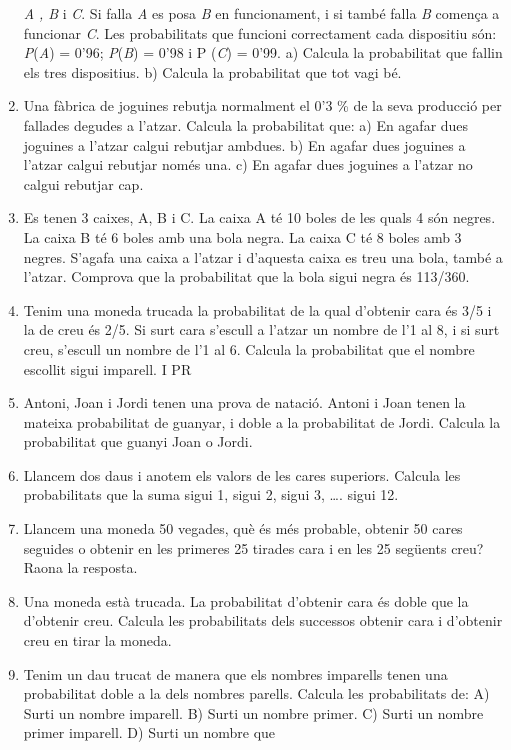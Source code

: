 \begin{enumerate}
  \emph{A} \emph{, B} i \emph{C}. Si falla \emph{A} es posa \emph{B} en
  funcionament, i si també falla \emph{B} comença a funcionar \emph{C}.
  Les probabilitats que funcioni correctament cada dispositiu són:
  \emph{P}(\emph{A}) = 0'96; \emph{P}(\emph{B}) = 0'98 i P (\emph{C}) =
  0'99. a) Calcula la probabilitat que fallin els tres dispositius. b)
  Calcula la probabilitat que tot vagi bé.
\item
  Una fàbrica de joguines rebutja normalment el 0'3 \% de la seva
  producció per fallades degudes a l'atzar. Calcula la probabilitat que:
  a) En agafar dues joguines a l'atzar calgui rebutjar ambdues. b) En
  agafar dues joguines a l'atzar calgui rebutjar només una. c) En agafar
  dues joguines a l'atzar no calgui rebutjar cap. 
\item
  Es tenen 3 caixes, A, B i C. La caixa A té 10 boles de les quals 4 són
  negres. La caixa B té 6 boles amb una bola negra. La caixa C té 8
  boles amb 3 negres. S'agafa una caixa a l'atzar i d'aquesta caixa es
  treu una bola, també a l'atzar. Comprova que la probabilitat que la
  bola sigui negra és 113/360.
\item
  Tenim una moneda trucada la probabilitat de la qual d'obtenir cara és
  3/5 i la de creu és 2/5. Si surt cara s'escull a l'atzar un nombre de
  l'1 al 8, i si surt creu, s'escull un nombre de l'1 al 6. Calcula la
  probabilitat que el nombre escollit sigui imparell. I PR
\item
  Antoni, Joan i Jordi tenen una prova de natació. Antoni i Joan tenen
  la mateixa probabilitat de guanyar, i doble a la probabilitat de
  Jordi. Calcula la probabilitat que guanyi Joan o Jordi.
\item
  Llancem dos daus i anotem els valors de les cares superiors. Calcula
  les probabilitats que la suma sigui 1, sigui 2, sigui 3, \ldots{}.
  sigui 12.
\item
  Llancem una moneda 50 vegades, què és més probable, obtenir 50 cares
  seguides o obtenir en les primeres 25 tirades cara i en les 25
  següents creu? Raona la resposta.
\item
  Una moneda està trucada. La probabilitat d'obtenir cara és doble que
  la d'obtenir creu. Calcula les probabilitats dels successos obtenir
  cara i d'obtenir creu en tirar la moneda.
\item
  Tenim un dau trucat de manera que els nombres imparells tenen una
  probabilitat doble a la dels nombres parells. Calcula les
  probabilitats de: A) Surti un nombre imparell. B) Surti un nombre
  primer. C) Surti un nombre primer imparell. D) Surti un nombre que

\end{enumerate}
